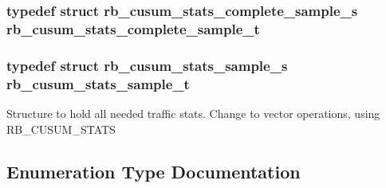 \subsubsection[{rb\+\_\+cusum\+\_\+stats\+\_\+complete\+\_\+sample\+\_\+t}]{\setlength{\rightskip}{0pt plus 5cm}typedef struct {\bf rb\+\_\+cusum\+\_\+stats\+\_\+complete\+\_\+sample\+\_\+s} {\bf rb\+\_\+cusum\+\_\+stats\+\_\+complete\+\_\+sample\+\_\+t}}\label{rb__cusum_8h_a919538096f086726379fe9e34e4748d4}
\subsubsection[{rb\+\_\+cusum\+\_\+stats\+\_\+sample\+\_\+t}]{\setlength{\rightskip}{0pt plus 5cm}typedef struct {\bf rb\+\_\+cusum\+\_\+stats\+\_\+sample\+\_\+s} {\bf rb\+\_\+cusum\+\_\+stats\+\_\+sample\+\_\+t}}\label{rb__cusum_8h_a12d547e4748bc25176ee3307c493b76a}
Structure to hold all needed traffic stats.  Change to vector operations, using R\+B\+\_\+\+C\+U\+S\+U\+M\+\_\+\+S\+T\+A\+T\+S 

\subsection{Enumeration Type Documentation}
